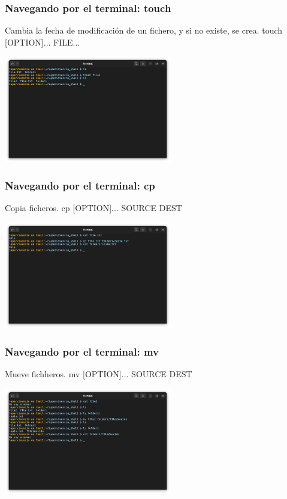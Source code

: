 \documentclass[10pt]{beamer}
\begin{document}
	\begin{frame}
		\frametitle{Navegando por el terminal: touch}
		\begin{alertblock}{Cambia la fecha de modificación de un fichero, y si no existe, se crea.}
			touch [OPTION]... FILE...
		\end{alertblock}
		\begin{center}
			\includegraphics[width=0.55\textwidth]{touch}
		\end{center}
	\end{frame}
	
	\begin{frame}
		\frametitle{Navegando por el terminal: cp}
		\begin{alertblock}{Copia ficheros.}
			cp [OPTION]... SOURCE DEST
		\end{alertblock}
		\begin{center}
			\includegraphics[width=0.55\textwidth]{cp}
		\end{center}
	\end{frame}	
		
	\begin{frame}
		\frametitle{Navegando por el terminal: mv}
		\begin{alertblock}{Mueve fichheros.}
			mv [OPTION]... SOURCE DEST
		\end{alertblock}
		\begin{center}
			\includegraphics[width=0.55\textwidth]{mv}
		\end{center}
	\end{frame}	
		
\end{document}
